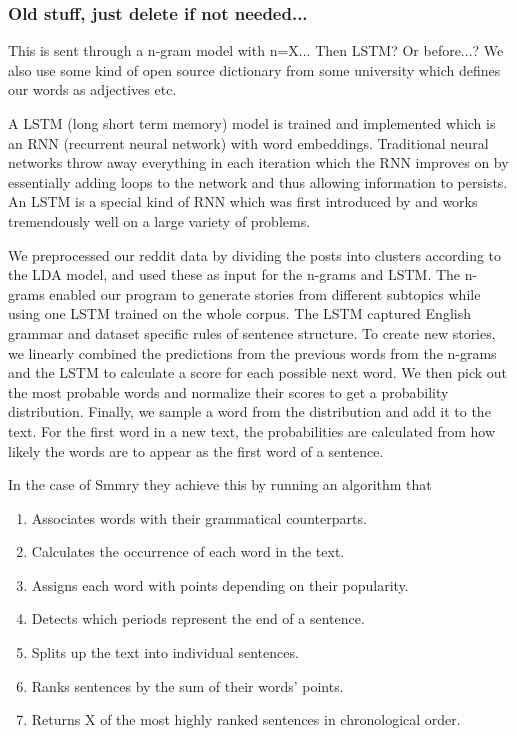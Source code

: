 \subsubsection{Old stuff, just delete if not needed...}

This is sent through a n-gram model with n=X... Then LSTM? Or before...? We also use some kind of open source dictionary from some university which defines our words as adjectives etc.

A LSTM (long short term memory) model is trained and implemented which is an RNN (recurrent neural network) with word embeddings. Traditional neural networks throw away everything in each iteration which the RNN improves on by essentially adding loops to the network and thus allowing information to persists\autocite{LSTM}. An LSTM is a special kind of RNN which was first introduced by \textcite{LSTMarticle} and works tremendously well on a large variety of problems\autocite{LSTM}.


We preprocessed our reddit data by dividing the posts into clusters according to the LDA model, and used these as input for the n-grams and LSTM. The n-grams enabled our program to generate stories from different subtopics while using one LSTM trained on the whole corpus. The LSTM captured English grammar and dataset specific rules of sentence structure. To create new stories, we linearly combined the predictions from the previous words from the n-grams and the LSTM to calculate a score for each possible next word. We then pick out the most probable words and normalize their scores to get a probability distribution. Finally, we sample a word from the distribution and add it to the text. For the first word in a new text, the probabilities are calculated from how likely the words are to appear as the first word of a sentence.

In the case of Smmry they achieve this by running an algorithm that
\begin{enumerate}
\item Associates words with their grammatical counterparts.
\item Calculates the occurrence of each word in the text.
\item Assigns each word with points depending on their popularity.
\item Detects which periods represent the end of a sentence.
\item Splits up the text into individual sentences.
\item Ranks sentences by the sum of their words' points.
\item Returns X of the most highly ranked sentences in chronological order.
\end{enumerate}

